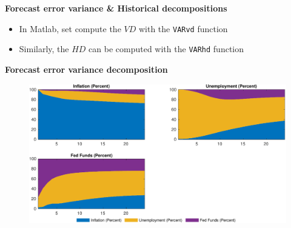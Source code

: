 \documentclass[10pt,english,t,aspectratio=169,ignorenonframetext]{beamer}
\begin{document}

\begin{frame}
{\textbf{Forecast error variance \& Historical decompositions}}\bigskip

\begin{itemize}
\item In Matlab, set compute the $VD$ with the \colorbox{script!80}{\small%
\texttt{VARvd}} function\medskip

\begin{minipage}[b]{.9\textwidth}
\end{minipage}

\bigskip

\item Similarly, the $HD$ can be computed with the \colorbox{script!80}{%
\small\texttt{VARhd}} function\medskip

\begin{minipage}[b]{.9\textwidth}
\end{minipage}
\end{itemize}
\end{frame}


\begin{frame}
{\textbf{Forecast error variance decomposition}}\medskip

\begin{figure}[h]
\includegraphics[width=.75\textwidth]{SW_VD.pdf}
\end{figure}
\end{frame}
\end{document}
